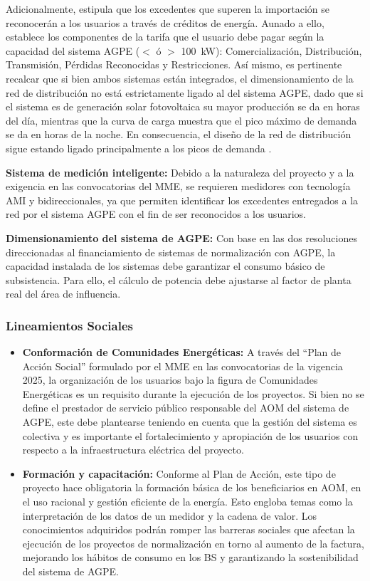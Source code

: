 Adicionalmente, estipula que los excedentes que superen la importación se reconocerán a los usuarios a través de créditos de energía. Aunado a ello, establece los componentes de la tarifa que el usuario debe pagar según la capacidad del sistema AGPE ($<$ ó $>$ 100~kW): Comercialización, Distribución, Transmisión, Pérdidas Reconocidas y Restricciones. Así mismo, es pertinente recalcar que si bien ambos sistemas están integrados, el dimensionamiento de la red de distribución no está estrictamente ligado al del sistema AGPE, dado que si el sistema es de generación solar fotovoltaica su mayor producción se da en horas del día, mientras que la curva de carga muestra que el pico máximo de demanda se da en horas de la noche. En consecuencia, el diseño de la red de distribución sigue estando ligado principalmente a los picos de demanda \parencite{CREGCargoRespaldo2023, ResolucionCREG174_2021}.

\textbf{Sistema de medición inteligente:} Debido a la naturaleza del proyecto y a la exigencia en las convocatorias del MME, se requieren medidores con tecnología AMI y bidireccionales, ya que permiten identificar los excedentes entregados a la red por el sistema AGPE con el fin de ser reconocidos a los usuarios.

\textbf{Dimensionamiento del sistema de AGPE:} Con base en las dos resoluciones direccionadas al financiamiento de sistemas de normalización con AGPE, la capacidad instalada de los sistemas debe garantizar el consumo básico de subsistencia. Para ello, el cálculo de potencia debe ajustarse al factor de planta real del área de influencia.

\subsubsection{Lineamientos Sociales}

\begin{itemize}
    \item \textbf{Conformación de Comunidades Energéticas:} A través del ``Plan de Acción Social'' formulado por el MME en las convocatorias de la vigencia 2025, la organización de los usuarios bajo la figura de Comunidades Energéticas es un requisito durante la ejecución de los proyectos. Si bien no se define el prestador de servicio público responsable del AOM del sistema de AGPE, este debe plantearse teniendo en cuenta que la gestión del sistema es colectiva y es importante el fortalecimiento y apropiación de los usuarios con respecto a la infraestructura eléctrica del proyecto.

    \item \textbf{Formación y capacitación:} Conforme al Plan de Acción, este tipo de proyecto hace obligatoria la formación básica de los beneficiarios en AOM, en el uso racional y gestión eficiente de la energía. Esto engloba temas como la interpretación de los datos de un medidor y la cadena de valor. Los conocimientos adquiridos podrán romper las barreras sociales que afectan la ejecución de los proyectos de normalización en torno al aumento de la factura, mejorando los hábitos de consumo en los BS y garantizando la sostenibilidad del sistema de AGPE.
\end{itemize}


